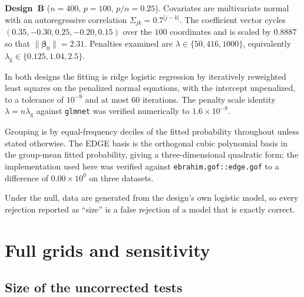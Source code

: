 \documentclass[11pt,a4paper]{article}
\newcommand{\bb}{\boldsymbol{\beta}}
\theoremstyle{plain}
\theoremstyle{remark}
\begin{document}
\textbf{Design~B} ($n = 400$, $p = 100$, $p/n = 0.25$). Covariates are multivariate
normal with an autoregressive correlation $\Sigma_{jk} = 0.7^{|j-k|}$. The coefficient
vector cycles $(0.35, -0.30, 0.25, -0.20, 0.15)$ over the $100$ coordinates and is scaled
by $0.8887$ so that $\|\bb_0\| = 2.31$. Penalties examined are
$\lambda \in \{50, 416, 1000\}$, equivalently
$\lambda_{\mathrm{g}} \in \{0.125, 1.04, 2.5\}$.

In both designs the fitting is ridge logistic regression by iteratively reweighted least
squares on the penalized normal equations, with the intercept unpenalized, to a tolerance
of $10^{-9}$ and at most $60$ iterations. The penalty scale identity
$\lambda = n\lambda_{\mathrm{g}}$ against \texttt{glmnet} was verified numerically to
$1.6\times10^{-9}$.

Grouping is by equal-frequency deciles of the fitted probability throughout unless stated
otherwise. The EDGE basis is the orthogonal cubic polynomial basis in the group-mean
fitted probability, giving a three-dimensional quadratic form; the implementation used
here was verified against \texttt{ebrahim.gof::edge.gof} to a difference of
$0.00\times10^{0}$ on three datasets.

Under the null, data are generated from the design's own logistic model, so every
rejection reported as ``size'' is a false rejection of a model that is exactly correct.


\section{Full grids and sensitivity}\label{sec:grids}

\subsection{Size of the uncorrected tests}\label{sec:naivegrid}
\end{document}
